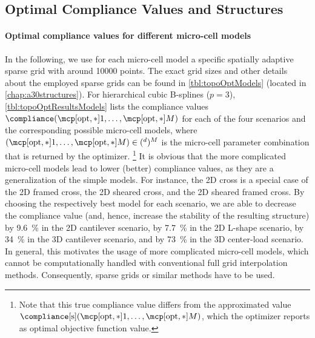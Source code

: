 \subsection{Optimal Compliance Values and Structures}
\label{sec:644optimization}

\paragraph{Optimal compliance values for different micro-cell models}

In the following, we use for each micro-cell model
a specific spatially adaptive sparse grid with around \num{10000} points.
The exact grid sizes and other details about the employed sparse grids
can be found in \cref{tbl:topoOptModels}
(located in \cref{chap:a30structures}).
For hierarchical cubic B-splines ($p = 3$),
\cref{tbl:topoOptResultsModels} lists the
compliance values $\compliance(\mcpoptappr{1}, \dotsc, \mcpoptappr{M})$
for each of the four scenarios
and the corresponding possible micro-cell models,
where $(\mcpoptappr{1}, \dotsc, \mcpoptappr{M}) \in (\real^d)^M$
is the micro-cell parameter combination that is returned by the optimizer.%
\footnote{%
  Note that this true compliance value differs from the
  approximated value
  $\complianceintp(\mcpoptappr{1}, \dotsc, \mcpoptappr{M})$,
  which the optimizer reports as optimal objective function value.%
}
It is obvious that the more complicated micro-cell models
lead to lower (better) compliance values,
as they are a generalization of the simple models.
For instance, the 2D cross is a special case of
the 2D framed cross, the 2D sheared cross, and the 2D sheared framed cross.
By choosing the respectively best model for each scenario,
we are able to decrease the compliance value
(and, hence, increase the stability of the resulting structure)
by \SI{9.6}{\percent} in the 2D cantilever scenario,
by \SI{7.7}{\percent} in the 2D L-shape scenario,
by \SI{34}{\percent} in the 3D cantilever scenario, and
by \SI{73}{\percent} in the 3D center-load scenario.
In general, this motivates the usage of more complicated micro-cell models,
which cannot be computationally handled with
conventional full grid interpolation methods.
Consequently, sparse grids or similar methods have to be used.

